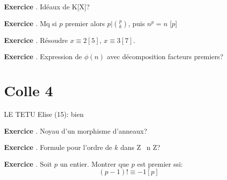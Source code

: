 \documentclass[10pt,a4paper]{article}
\newcounter{question}
\newcounter{exo}
\newenvironment{exo}{\vspace{0.5cm}\setcounter{question}{0}\addtocounter{exo}{1} \noindent \textbf{Exercice \theexo}. \normalsize }{\par}
\begin{document}
	\begin{exo}
		Idéaux de K[X]?
	\end{exo}
	
	\begin{exo}
		Mq si $p$ premier alors $p \vert \binom{p}{k}$, puis $n^p = n$ [$p$]
	\end{exo}

	\begin{exo}
		Résoudre $x \equiv 2 [5]$, $x \equiv 3 [7]$.
	\end{exo}
	
	\begin{exo}
		Expression de $\phi(n)$ avec décomposition facteurs premiers?
	\end{exo}
	 
	\section*{Colle 4}
	LE TETU Elise (15): bien\\
	
	\begin{exo}
		Noyau d'un morphisme d'anneaux?
	\end{exo}
	
	\begin{exo}
		Formule pour l'ordre de $k$ dans Z \ n Z?
	\end{exo}
	
	\begin{exo}
		Soit $p$ un entier. Montrer que $p$ est premier ssi:
		$$(p-1)! \equiv -1 [p]$$
	\end{exo}
\end{document}
